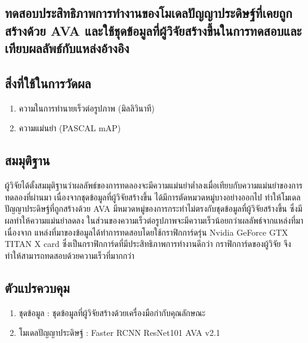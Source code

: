 \subsection{ทดสอบประสิทธิภาพการทำงานของโมเดลปัญญาประดิษฐ์ที่เคยถูกสร้างด้วย AVA และใช้ชุดข้อมูลที่ผู้วิจัยสร้างขึ้นในการทดสอบและเทียบผลลัพธ์กับแหล่งอ้างอิง}
\subsection*{สิ่งที่ใช้ในการวัดผล}
	\begin{enumerate}
		\setlength\itemsep{-0.25em}
		\item ความในการทำนายเร็วต่อรูปภาพ (มิลลิวินาที)
		\item ความแม่นยำ (PASCAL mAP)
	\end{enumerate}
\subsection*{สมมุติฐาน}ผู้วิจัยได้ตั้งสมมุติฐานว่าผลลัพธ์ของการทดลองจะมีความแม่นยำต่ำลงเมื่อเทียบกับความแม่นยำของการทดลองที่ผ่านมา เนื่องจากชุดข้อมูลที่ผู้วิจัยสร้างขึ้น ได้มีการตัดหมวดหมู่บางอย่างออกไป 
ทำให้โมเดลปัญญาประดิษฐ์ที่ถูกสร้างด้วย AVA มีหมวดหมู่ของการกระทำไม่ตรงกับชุดข้อมูลที่ผู้วิจัยสร้างขึ้น ซึ่งมีผลทำให้ความแม่นยำลดลง ในส่วนของความเร็วต่อรูปภาพจะมีความเร็วน้อยกว่าผลลัพธ์จากแหล่งที่มา เนื่องจาก แหล่งที่มาของข้อมูลได้ทำการทดสอบโดยใช้กราฟิกการ์ดรุ่น Nvidia GeForce GTX TITAN X card ซึ่งเป็นกราฟิกการ์ดที่มีประสิทธิภาพการทำงานดีกว่า กราฟิกการ์ดของผู้วิจัย จึงทำให้สามารถทดสอบด้วยความเร็วที่มากกว่า
\subsection*{ตัวแปรควบคุม}
	\begin{enumerate}
		\setlength\itemsep{-0.25em}
		\item ชุดข้อมูล : ชุดข้อมูลที่ผู้วิจัยสร้างด้วยเครื่องมือกำกับคุณลักษณะ
		\item โมเดลปัญญาประดิษฐ์ : Faster RCNN ResNet101 AVA v2.1
	\end{enumerate}
